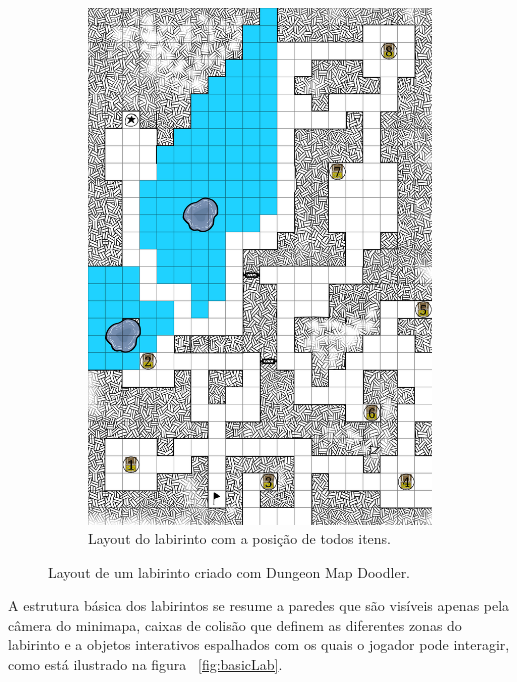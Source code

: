 \documentclass[
	12pt,				%
	openright,			%
	twoside,			%
	a4paper,			%
	english,			%
	french,				%
	spanish,			%
	brazil				%
	]{abntex2}
\begin{document}
\begin{figure}[h!]
\begin{subfigure}[b]{0.45\linewidth}
    \includegraphics[width=\linewidth]{dungeonItens.png}
    \caption{Layout do labirinto com a posição de todos itens.}
  \end{subfigure}
  \caption{Layout de um labirinto criado com Dungeon Map Doodler.}
  \label{fig:dungeonLayout}
\end{figure}

	A estrutura básica dos labirintos se resume a paredes que são visíveis apenas pela câmera do minimapa, caixas de colisão que definem as diferentes zonas do labirinto e a objetos interativos espalhados com os quais o jogador pode interagir, como está ilustrado na figura ~\ref{fig:basicLab}.
\end{document}

